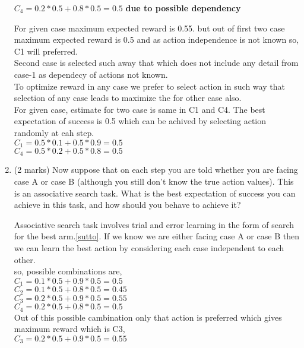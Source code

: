 \documentclass[addpoints,12pt,solution]{exam}
\begin{document}
\begin{questions}
\begin{enumerate}[label=(\alph*)]
\begin{solution}
\textbf{$C_4 = 0.2 *0.5 + 0.8*0.5 = 0.5$} \textbf{due to possible dependency} 


	
 For given case maximum expected reward is 0.55. but out of  first two case maximum expected reward is 0.5 and as action independence is not known so, C1 will preferred. \\
 
  Second case is selected such away that which does not include any detail from case-1 as dependecy of actions not known. \\
  
  To optimize reward in any case we prefer to select action in such way that selection of any case leads to maximize the for other case also. \\
  
 For given case, estimate for two case is same in C1 and C4. The best expectation of success is 0.5 which can be achived by selecting action randomly at eah step.\\

$C_1 = 0.5 * 0.1  + 0.5 * 0.9 = 0.5$ \\
$C_4 = 0.5*0.2 +0.5*0.8 =0.5$ \\

\end{solution}
    
    \item (2 marks) Now suppose that on each step you are told whether you are facing case A or case B (although you still don’t know the true action values). This is an associative search task. What is the best expectation of success you can achieve in this task, and how should you behave to achieve it?
\begin{solution}
Associative search task involves trial and error learning in the form of search for the best arm.\ref{sutto}.
If we know we are either facing case A or case B then we can learn the best action by considering each case independent to each other. \\
so, possible combinations are, \\
$C_1 = 0.1 *0.5 + 0.9*0.5 = 0.5$\\
$C_2 = 0.1 *0.5 + 0.8*0.5 = 0.45$\\
$C_3 = 0.2 *0.5 + 0.9*0.5 = 0.55$\\
$C_4 = 0.2 *0.5 + 0.8*0.5 = 0.5$\\


Out of this possible cambination only that action is preferred which gives maximum reward which is C3,\\
$C_3 = 0.2 *0.5 + 0.9*0.5 = 0.55$\\


\end{solution}
\end{enumerate}
\end{questions}
\end{document}
